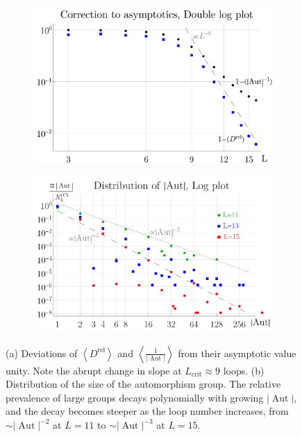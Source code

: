 \documentclass[11pt,a4paper]{article}
\newcommand{\abs}[1]{\lvert #1 \rvert}
\newcommand{\Aut}{\operatorname{Aut}}
\renewcommand{\|}{\rule[-0.4ex]{0.2ex}{1.2em}}
\begin{document}
\begin{figure}[htb]
	\centering
	\begin{subfigure}[b]{.49 \textwidth}
		\includegraphics[width=\textwidth]{ratio_correction}
		\subcaption{}
		\label{fig:ratio_correction}
	\end{subfigure}
	\begin{subfigure}[b]{.49 \textwidth}
		\includegraphics[width=\textwidth]{aut_distribution}
		\subcaption{}
		\label{fig:aut_distribution}
	\end{subfigure}
	\caption{(a) Deviations of $ \left \langle D^\text{rel}\right \rangle $ and $\left \langle \frac{1}{\abs{\Aut}} \right \rangle  $ from their asymptotic value unity. Note the abrupt change in slope at $L_\text{crit} \approx 9$ loops. 
	(b) Distribution of the size of the automorphism group. The relative prevalence of large groups decays polynomially with growing $\abs{\Aut}$, and the decay becomes steeper as the loop number increases, from $\sim \abs{\Aut}^{-2}$ at $L=11$ to $\sim \abs{\Aut}^{-3}$ at $L=15$. }
\end{figure}
\end{document}
